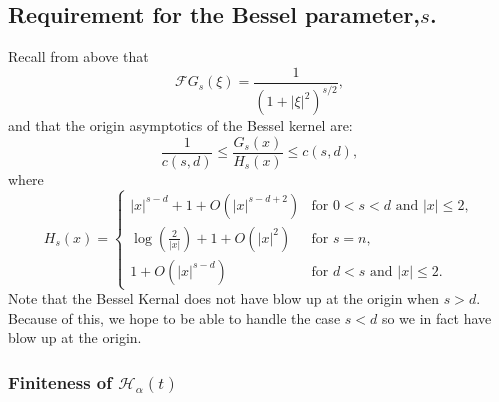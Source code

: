 \documentclass{article}
\numberwithin{equation}{section}
\begin{document}
\subsection{Requirement for the Bessel parameter,$s$.}
Recall from above that
	\begin{equation} \label{E:FBessel}
		\mathcal{F}G_s(\xi) = \frac{1}{(1+  |\xi|^2)^{s/2}},
	\end{equation}
and that the origin asymptotics of the Bessel kernel are:
	\[
		\frac{1}{c(s,d)} \le \frac{G_s(x)}{H_s(x)} \le c(s,d),
	\]
where
	\[
		H_s(x) =
		\begin{cases}
			|x|^{s-d} + 1 + O(|x|^{s-d+2})  & \text{for $0<s<d$ and $|x| \le 2$}, \\
			\log\left(\frac{2}{|x|}\right) + 1  +O(|x|^2) & \text{for $s=n$}, \\
			1 + O(|x|^{s-d}) & \text{for $d<s$ and $|x| \le 2$}.
		\end{cases}
	\]
Note that the Bessel Kernal does not have blow up at the origin when $s >d$. Because of this, we hope to be able to handle the case $s < d$ so we in fact have blow up at the origin.

\subsubsection{Finiteness of $\mathcal{H}_\alpha(t)$}
\end{document}
